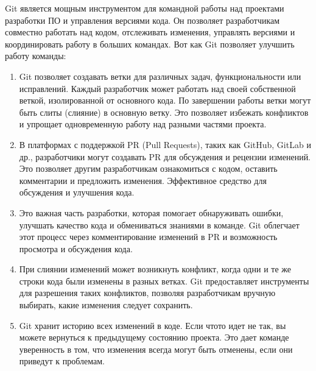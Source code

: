 \documentclass[letterpaper,10pt,russian]{sphinxmanual}
\begin{document}
\sphinxAtStartPar
Git является мощным инструментом для командной работы над проектами разработки ПО и управления версиями кода. Он позволяет разработчикам совместно работать над кодом, отслеживать изменения, управлять версиями и координировать работу в больших командах. Вот как Git позволяет улучшить работу команды:
\begin{enumerate}
%
\item {} 
\sphinxAtStartPar
{} Git позволяет создавать ветки для различных задач, функциональности или исправлений. Каждый разработчик может работать над своей собственной веткой, изолированной от основного кода. По завершении работы ветки могут быть слиты (слияние) в основную ветку. Это позволяет избежать конфликтов и упрощает одновременную работу над разными частями проекта.

\item {} 
\sphinxAtStartPar
{} В платформах с поддержкой PR (Pull Requests), таких как GitHub, GitLab и др., разработчики могут создавать PR для обсуждения и рецензии изменений. Это позволяет другим разработчикам ознакомиться с кодом, оставить комментарии и предложить изменения. Эффективное средство для обсуждения и улучшения кода.

\item {} 
\sphinxAtStartPar
{} Это важная часть разработки, которая помогает обнаруживать ошибки, улучшать качество кода и обмениваться знаниями в команде. Git облегчает этот процесс через комментирование изменений в PR и возможность просмотра и обсуждения кода.

\item {} 
\sphinxAtStartPar
{} При слиянии изменений может возникнуть конфликт, когда одни и те же строки кода были изменены в разных ветках. Git предоставляет инструменты для разрешения таких конфликтов, позволяя разработчикам вручную выбирать, какие изменения следует сохранить.

\item {} 
\sphinxAtStartPar
{} Git хранит историю всех изменений в коде. Если что\sphinxhyphen{}то идет не так, вы можете вернуться к предыдущему состоянию проекта. Это дает команде уверенность в том, что изменения всегда могут быть отменены, если они приведут к проблемам.


\end{enumerate}
\end{document}
